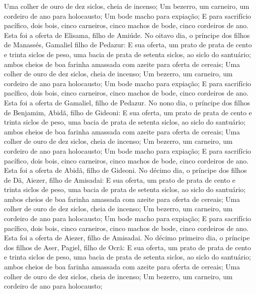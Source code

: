 {  Uma colher de ouro de dez siclos, cheia de incenso;
  Um bezerro, um carneiro, um cordeiro de ano para holocausto;
  Um bode macho para expiação;
  E para sacrifício pacífico, dois bois, cinco carneiros, cinco machos de bode, cinco cordeiros de ano. Esta foi a oferta de Elisama, filho de Amiúde.
  No oitavo dia, o príncipe dos filhos de Manassés, Gamaliel filho de Pedazur:
  E sua oferta, um prato de prata de cento e trinta siclos de peso, uma bacia de prata de setenta siclos, ao siclo do santuário; ambos cheios de boa farinha amassada com azeite para oferta de cereais; %
  Uma colher de ouro de dez siclos, cheia de incenso;
  Um bezerro, um carneiro, um cordeiro de ano para holocausto;
  Um bode macho para expiação;
  E para sacrifício pacífico, dois bois, cinco carneiros, cinco machos de bode, cinco cordeiros de ano. Esta foi a oferta de Gamaliel, filho de Pedazur.
  No nono dia, o príncipe dos filhos de Benjamim, Abidã, filho de Gideoni: %
  E sua oferta, um prato de prata de cento e trinta siclos de peso, uma bacia de prata de setenta siclos, ao siclo do santuário; ambos cheios de boa farinha amassada com azeite para oferta de cereais;
  Uma colher de ouro de dez siclos, cheia de incenso;
  Um bezerro, um carneiro, um cordeiro de ano para holocausto;
  Um bode macho para expiação;
  E para sacrifício pacífico, dois bois, cinco carneiros, cinco machos de bode, cinco cordeiros de ano. Esta foi a oferta de Abidã, filho de Gideoni.
  No décimo dia, o príncipe dos filhos de Dã, Aiezer, filho de Amisadai: %
  E sua oferta, um prato de prata de cento e trinta siclos de peso, uma bacia de prata de setenta siclos, ao siclo do santuário; ambos cheios de boa farinha amassada com azeite para oferta de cereais;
  Uma colher de ouro de dez siclos, cheia de incenso;
  Um bezerro, um carneiro, um cordeiro de ano para holocausto;
  Um bode macho para expiação;
  E para sacrifício pacífico, dois bois, cinco carneiros, cinco machos de bode, cinco cordeiros de ano. Esta foi a oferta de Aiezer, filho de Amisadai.
  No décimo primeiro dia, o príncipe dos filhos de Aser, Pagiel, filho de Ocrã: %
  E sua oferta, um prato de prata de cento e trinta siclos de peso, uma bacia de prata de setenta siclos, ao siclo do santuário; ambos cheios de boa farinha amassada com azeite para oferta de cereais;
  Uma colher de ouro de dez siclos, cheia de incenso;
  Um bezerro, um carneiro, um cordeiro de ano para holocausto;
}
